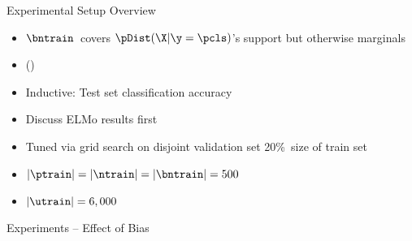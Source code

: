 \begin{frame}{Experimental Setup Overview}
  \begin{itemize}[<+->]
    \setlength{\itemsep}{6pt}
    \item $\bntrain$~covers  ${\pDist(\X \vert \y = \pcls)}$'s support but otherwise marginals 
    \item () 
  \end{itemize}
  \vfill
  \begin{itemize}[<+->]
    \setlength{\itemsep}{6pt}
    \item Inductive: Test set classification accuracy
    \item Discuss ELMo results first 
  \end{itemize}
  \vfill
  \begin{itemize}[<+->]
    \setlength{\itemsep}{6pt}
    \item Tuned via grid search on disjoint validation set 20\%~size of train set
    \item ${\abs{\ptrain} = \abs{\ntrain} = \abs{\bntrain} = 500}$
    \item ${\abs{\utrain} = 6,000}$
  \end{itemize}
\end{frame}

\begin{frame}{Experiments -- Effect of Bias}
  
\end{frame}

